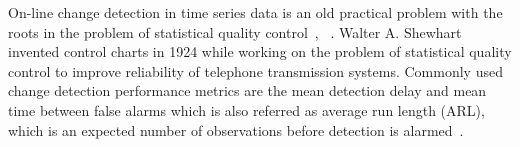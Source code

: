 On-line change detection in time series data is an old practical problem with the roots in the problem of statistical quality control~\cite{basseville1993detection}, ~\cite{NISTbook}.
Walter A. Shewhart invented control charts in 1924 while working on the problem of statistical quality control to improve reliability of telephone transmission systems.
Commonly used change detection performance metrics are the mean detection delay and mean time between false alarms which is also referred as average run length (ARL), which is an expected number of observations before detection is alarmed~\cite{basseville1993detection}.

